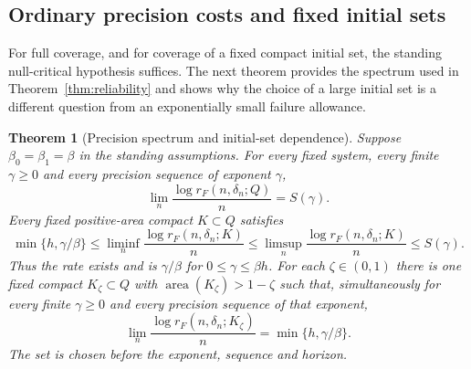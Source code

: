 \documentclass[11pt]{amsart}
\newtheorem{theorem}{Theorem}[section]
\theoremstyle{definition}
\theoremstyle{remark}
\newcommand{\area}{\operatorname{area}}
\numberwithin{equation}{section}
\begin{document}
\subsection{Ordinary precision costs and fixed initial sets}
For full coverage, and for coverage of a fixed compact initial set,
the standing null-critical hypothesis suffices. The next theorem
provides the spectrum used in Theorem~\ref{thm:reliability} and
shows why the choice of a large initial set is a different question
from an exponentially small failure allowance.
\begin{theorem}[Precision spectrum and initial-set dependence]\label{thm:main}
Suppose $\beta_0=\beta_1=\beta$ in the standing assumptions.
For every fixed system,
every finite $\gamma\ge0$ and every precision sequence of exponent
$\gamma$,
\begin{equation}\label{eq:spectrum}
\lim_n\frac{\log r_F(n,\delta_n;Q)}n=S(\gamma).
\end{equation}
Every fixed positive-area compact $K\subset Q$ satisfies
\begin{equation}\label{eq:universal}
\min\{h,\gamma/\beta\}\le
\liminf_n\frac{\log r_F(n,\delta_n;K)}n\le
\limsup_n\frac{\log r_F(n,\delta_n;K)}n\le
S(\gamma).
\end{equation}
Thus the rate exists and is $\gamma/\beta$ for $0\le\gamma\le\beta h$.
For each $\zeta\in(0,1)$ there is one fixed compact
$K_\zeta\subset Q$ with $\area(K_\zeta)>1-\zeta$ such that,
simultaneously for every finite $\gamma\ge0$ and every precision
sequence of that exponent,
\begin{equation}\label{eq:high}
\lim_n\frac{\log r_F(n,\delta_n;K_\zeta)}n
                         =\min\{h,\gamma/\beta\}.
\end{equation}
The set is chosen before the exponent, sequence and horizon.
\end{theorem}
\end{document}
